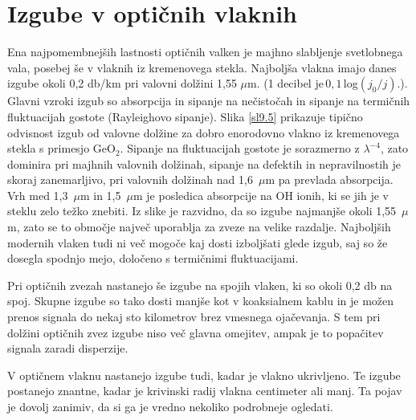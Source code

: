 \documentclass[11pt,fleqn]{book} %
\begin{document}
\section{Izgube v optičnih vlaknih}

Ena najpomembnejših lastnosti optičnih valken je majhno slabljenje
svetlobnega vala, posebej še v vlaknih iz kremenovega stekla. Najboljša
vlakna imajo danes izgube okoli 0,2 db/km pri valovni dolžini 1,55
$\mu$m. (1 decibel je$\,0,1\,$log$(j_{0}/j).$). Glavni vzroki izgub
so absorpcija in sipanje na nečistočah in sipanje na termičnih fluktuacijah
gostote (Rayleighovo sipanje). Slika \ref{sl9.5} prikazuje tipično
odvisnost izgub od valovne dolžine za dobro enorodovno vlakno iz kremenovega
stekla s primesjo GeO$_{2}.$ Sipanje na fluktuacijah gostote je sorazmerno
z $\lambda^{-4}$, zato dominira pri majhnih valovnih dolžinah, sipanje
na defektih in nepravilnostih je skoraj zanemarljivo, pri valovnih
dolžinah nad 1,6~$\mu$m pa prevlada absorpcija. Vrh med 1,3~$\mu$m
in 1,5~$\mu$m je posledica absorpcije na OH ionih, ki se jih je
v steklu zelo težko znebiti. Iz slike je razvidno, da so izgube najmanjše
okoli 1,55~$\mu$m, zato se to območje največ uporablja za zveze
na velike razdalje. Najboljših modernih vlaken tudi ni več mogoče
kaj dosti izboljšati glede izgub, saj so že dosegla spodnjo mejo,
določeno s termičnimi fluktuacijami.

Pri optičnih zvezah nastanejo še izgube na spojih vlaken, ki so okoli
0,2 db na spoj. Skupne izgube so tako dosti manjše kot v koaksialnem
kablu in je možen prenos signala do nekaj sto kilometrov brez vmesnega
ojačevanja. S tem pri dolžini optičnih zvez izgube niso več glavna
omejitev, ampak je to popačitev signala zaradi disperzije.

V optičnem vlaknu nastanejo izgube tudi, kadar je vlakno ukrivljeno.
Te izgube postanejo znantne, kadar je krivinski radij vlakna centimeter
ali manj. Ta pojav je dovolj zanimiv, da si ga je vredno nekoliko
podrobneje ogledati.
\end{document}
